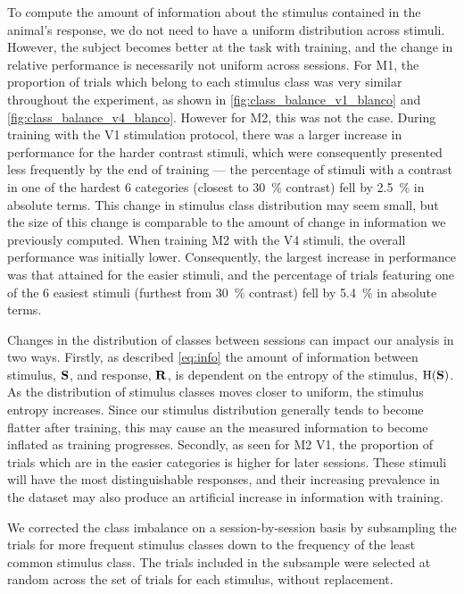 To compute the amount of information about the stimulus contained in the animal's response, we do not need to have a uniform distribution across stimuli.
However, the subject becomes better at the task with training, and the change in relative performance is necessarily not uniform across sessions.
For \ac{M1}, the proportion of trials which belong to each stimulus class was very similar throughout the experiment, as shown in \autoref{fig:class_balance_v1_blanco} and \autoref{fig:class_balance_v4_blanco}.
However for \ac{M2}, this was not the case.
During training with the \ac{V1} stimulation protocol, there was a larger increase in performance for the harder contrast stimuli, which were consequently presented less frequently by the end of training --- the percentage of stimuli with a contrast in one of the hardest 6 categories (closest to \SI{30}{\percent} contrast) fell by \SI{2.5}{\percent} in absolute terms.
This change in stimulus class distribution may seem small, but the size of this change is comparable to the amount of change in information we previously computed.
When training \ac{M2} with the \ac{V4} stimuli, the overall performance was initially lower.
Consequently, the largest increase in performance was that attained for the easier stimuli, and the percentage of trials featuring one of the 6 easiest stimuli (furthest from \SI{30}{\percent} contrast) fell by \SI{5.4}{\percent} in absolute terms.

Changes in the distribution of classes between sessions can impact our analysis in two ways.
Firstly, as described \autoref{eq:info} the amount of information between stimulus, $\mathbf{S}$, and response, $\mathbf{R}$, is dependent on the entropy of the stimulus, $\operatorname{H}(\mathbf{S})$.
As the distribution of stimulus classes moves closer to uniform, the stimulus entropy increases.
Since our stimulus distribution generally tends to become flatter after training, this may cause an the measured information to become inflated as training progresses.
Secondly, as seen for \ac{M2} \ac{V1}, the proportion of trials which are in the easier categories is higher for later sessions.
These stimuli will have the most distinguishable responses, and their increasing prevalence in the dataset may also produce an artificial increase in information with training.

We corrected the class imbalance on a session-by-session basis by subsampling the trials for more frequent stimulus classes down to the frequency of the least common stimulus class.
The trials included in the subsample were selected at random across the set of trials for each stimulus, without replacement.


